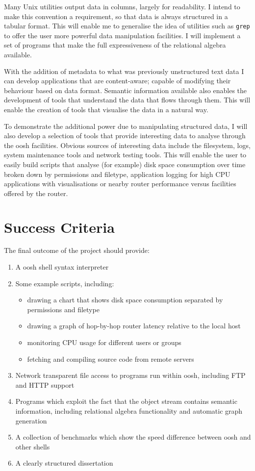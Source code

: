\documentclass[12pt]{article}
\begin{document}
Many Unix utilities output data in columns, largely for readability. I
intend to make this convention a requirement, so that data is always
structured in a tabular format. This will enable me to generalise the
idea of utilities such as \texttt{grep} to offer the user more powerful data
manipulation facilities. I will implement a set of programs that make
the full expressiveness of the relational algebra available.

With the addition of metadata to what was previously unstructured text
data I can develop applications that are content-aware; capable of
modifying their behaviour based on data format. Semantic information
available also enables the development of tools that understand the
data that flows through them. This will enable the creation of tools
that visualise the data in a natural way.

To demonstrate the additional power due to manipulating structured
data, I will also develop a selection of tools that provide
interesting data to analyse through the oosh facilities. Obvious
sources of interesting data include the filesystem, logs, system
maintenance tools and network testing tools. This will enable the user
to easily build scripts that analyse (for example) disk space
consumption over time broken down by permissions and filetype,
application logging for high CPU applications with visualisations or
nearby router performance versus facilities offered by the router.

\section*{Success Criteria}
The final outcome of the project should provide:

\begin{enumerate}
\item A oosh shell syntax interpreter
\item Some example scripts, including:
  \begin{itemize}
  \item drawing a chart that shows disk space consumption separated by
    permissions and filetype
  \item drawing a graph of hop-by-hop router latency relative to the
    local host
  \item monitoring CPU usage for different users or groups
  \item fetching and compiling source code from remote servers
  \end{itemize}
\item Network transparent file access to programs run within oosh,
  including FTP and HTTP support
\item Programs which exploit the fact that the object stream
  contains semantic information, including relational algebra
  functionality and automatic graph generation
\item A collection of benchmarks which show the speed difference
  between oosh and other shells
\item A clearly structured dissertation
\end{enumerate}
\end{document}
